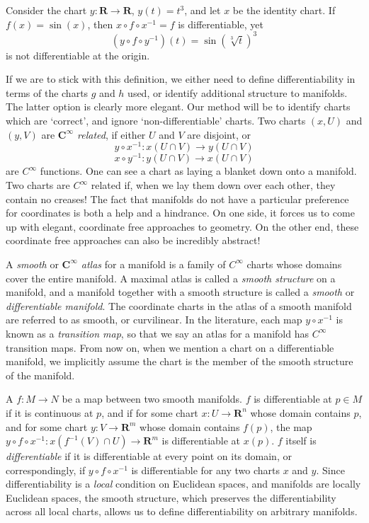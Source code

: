 \begin{example}
    Consider the chart $y: \mathbf{R} \to \mathbf{R}$, $y(t) = t^3$, and let $x$ be the identity chart. If $f(x) = \sin(x)$, then $x \circ f \circ x^{-1} = f$ is differentiable, yet
    \[ (y \circ f \circ y^{-1})(t) = \sin(\sqrt[3]{t})^3 \]
    is not differentiable at the origin.
\end{example}

If we are to stick with this definition, we either need to define differentiability in terms of the charts $g$ and $h$ used, or identify additional structure to manifolds. The latter option is clearly more elegant. Our method will be to identify charts which are `correct', and ignore `non-differentiable' charts. Two charts $(x,U)$ and $(y,V)$ are \emph{$\mathbf{C^\infty}$ related}, if either $U$ and $V$ are disjoint, or
%
\[ y \circ x^{-1} : x(U \cap V) \to y(U \cap V) \]
%
\[ x \circ y^{-1} : y(U \cap V) \to x(U \cap V) \]
%
are $C^\infty$ functions. One can see a chart as laying a blanket down onto a manifold. Two charts are $C^\infty$ related if, when we lay them down over each other, they contain no creases! The fact that manifolds do not have a particular preference for coordinates is both a help and a hindrance. On one side, it forces us to come up with elegant, coordinate free approaches to geometry. On the other end, these coordinate free approaches can also be incredibly abstract!

A \emph{smooth} or \emph{$\mathbf{C^\infty}$ atlas} for a manifold is a family of $C^\infty$ charts whose domains cover the entire manifold. A maximal atlas is called a \emph{smooth structure} on a manifold, and a manifold together with a smooth structure is called a \emph{smooth} or \emph{differentiable manifold}. The coordinate charts in the atlas of a smooth manifold are referred to as smooth, or curvilinear. In the literature, each map $y \circ x^{-1}$ is known as a \emph{transition map}, so that we say an atlas for a manifold has $C^\infty$ transition maps. From now on, when we mention a chart on a differentiable manifold, we implicitly assume the chart is the member of the smooth structure of the manifold.

A $f:M \to N$ be a map between two smooth manifolds. $f$ is differentiable at $p \in M$ if it is continuous at $p$, and if for some chart $x:U \to \mathbf{R}^n$ whose domain contains $p$, and for some chart $y:V \to \mathbf{R}^m$ whose domain contains $f(p)$, the map $y \circ f \circ x^{-1}:x(f^{-1}(V) \cap U) \to \mathbf{R}^m$ is differentiable at $x(p)$. $f$ itself is \emph{differentiable} if it is differentiable at every point on its domain, or correspondingly, if $y \circ f \circ x^{-1}$ is differentiable for any two charts $x$ and $y$. Since differentiability is a {\it local} condition on Euclidean spaces, and manifolds are locally Euclidean spaces, the smooth structure, which preserves the differentiability across all local charts, allows us to define differentiability on arbitrary manifolds.

